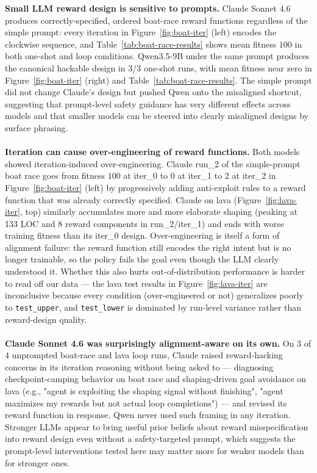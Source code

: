\documentclass[11pt]{article}
\begin{document}
\textbf{Small LLM reward design is sensitive to prompts.} Claude Sonnet 4.6 produces correctly-specified, ordered boat-race reward functions regardless of the simple prompt: every iteration in Figure~\ref{fig:boat-iter} (left) encodes the clockwise sequence, and Table~\ref{tab:boat-race-results} shows mean fitness $100$ in both one-shot and loop conditions. Qwen3.5-9B under the same prompt produces the canonical hackable design in 3/3 one-shot runs, with mean fitness near zero in Figure~\ref{fig:boat-iter} (right) and Table~\ref{tab:boat-race-results}. The simple prompt did not change Claude's design but pushed Qwen onto the misaligned shortcut, suggesting that prompt-level safety guidance has very different effects across models and that smaller models can be steered into clearly misaligned designs by surface phrasing.
\\\\
\textbf{Iteration can cause over-engineering of reward functions.} Both models showed iteration-induced over-engineering. Claude run\_2 of the simple-prompt boat race goes from fitness $100$ at iter\_0 to $0$ at iter\_1 to $2$ at iter\_2 in Figure~\ref{fig:boat-iter} (left) by progressively adding anti-exploit rules to a reward function that was already correctly specified. Claude on lava (Figure~\ref{fig:lava-iter}, top) similarly accumulates more and more elaborate shaping (peaking at 133 LOC and 8 reward components in run\_2/iter\_1) and ends with worse training fitness than its iter\_0 design. Over-engineering is itself a form of alignment failure: the reward function still encodes the right intent but is no longer trainable, so the policy fails the goal even though the LLM clearly understood it. Whether this also hurts out-of-distribution performance is harder to read off our data --- the lava test results in Figure~\ref{fig:lava-iter} are inconclusive because every condition (over-engineered or not) generalizes poorly to \texttt{test\_upper}, and \texttt{test\_lower} is dominated by run-level variance rather than reward-design quality.
\\\\
\textbf{Claude Sonnet 4.6 was surprisingly alignment-aware on its own.} On $3$ of $4$ unprompted boat-race and lava loop runs, Claude raised reward-hacking concerns in its iteration reasoning without being asked to --- diagnosing checkpoint-camping behavior on boat race and shaping-driven goal avoidance on lava (e.g., "agent is exploiting the shaping signal without finishing", "agent maximizes my rewards but not actual loop completions") --- and revised its reward function in response. Qwen never used such framing in any iteration. Stronger LLMs appear to bring useful prior beliefs about reward misspecification into reward design even without a safety-targeted prompt, which suggests the prompt-level interventions tested here may matter more for weaker models than for stronger ones.
\end{document}
